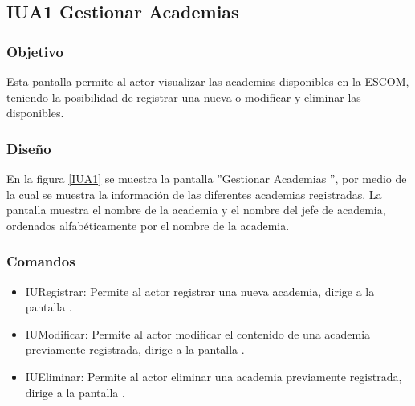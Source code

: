 \subsection{IUA1 Gestionar Academias}

\subsubsection{Objetivo}
	
Esta pantalla permite al actor visualizar las academias disponibles en la ESCOM, teniendo la posibilidad de registrar una nueva o modificar y eliminar las disponibles.

\subsubsection{Diseño}

    En la figura \ref{IUA1} se muestra la pantalla ''Gestionar Academias '', por medio de la cual se muestra la información de las diferentes academias registradas. La pantalla muestra el nombre de la academia y el nombre del jefe de academia, ordenados alfabéticamente por el nombre de la academia.
 

\subsubsection{Comandos}
    \begin{itemize}
	\item IURegistrar: Permite al actor registrar una nueva academia, dirige a la pantalla .
	
	\item IUModificar: Permite al actor modificar el contenido de una academia previamente registrada, dirige a la pantalla .
	
	\item IUEliminar: Permite al actor eliminar una academia previamente registrada, dirige a la pantalla .
    \end{itemize}
